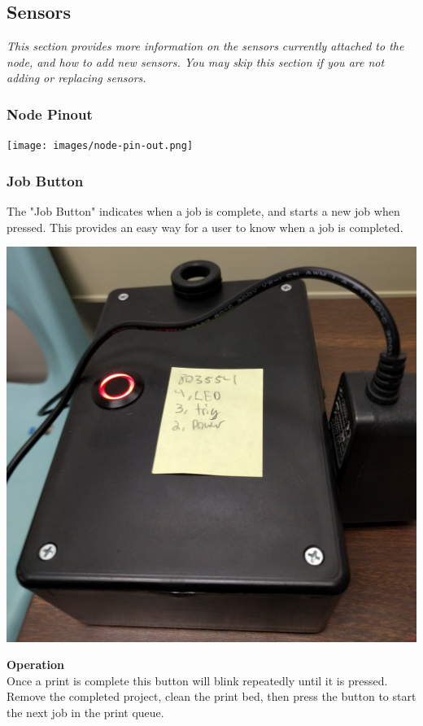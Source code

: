   \subsection{Sensors}
  \emph{This section provides more information on the sensors currently attached to the node, and 
      how to add new sensors.  You may skip this section if you are not adding or replacing sensors.}\\
  \subsubsection{Node Pinout}
  \begin{center}
        \texttt{[image: images/node-pin-out.png]}
  \end{center}
    \subsubsection{Job Button}
      The "Job Button" indicates when a job is complete, and starts a new job when pressed. This provides an easy way
      for a user to know when a job is completed.
            \begin{center}
      \includegraphics[scale=0.1]{images/control-box.png}
\end{center}

      \textbf{Operation}\\
      Once a print is complete this button will blink repeatedly until it is pressed.  Remove the completed project,
      clean the print bed, then press the button to start the next job in the print queue.\\


